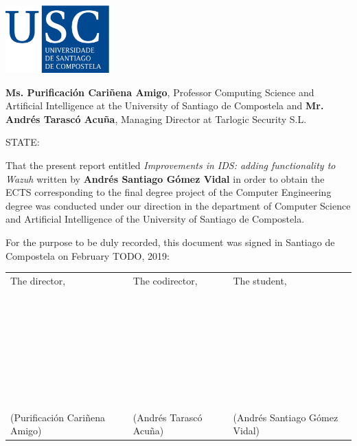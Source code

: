 \pagestyle{plain}
\includegraphics[width=4cm]{figuras/logo_usc.eps}

\vspace{1cm}
{\bf Ms. Purificación Cariñena Amigo}, Professor Computing Science and Artificial Intelligence at the University of Santiago de Compostela and {\bf Mr. Andrés Tarascó Acuña}, Managing Director at Tarlogic Security S.L.

\vspace{1cm}
STATE:

\vspace{1cm}
That the present report entitled \textit{Improvements in IDS: adding functionality to Wazuh} written by \textbf{Andrés Santiago Gómez Vidal} in order to obtain the ECTS corresponding to the final degree project of the Computer Engineering degree was conducted under our direction in the department of Computer Science and Artificial Intelligence of the University of Santiago de Compostela.

\vspace{1cm}
For the purpose to be duly recorded, this document was signed in Santiago de Compostela on February TODO, 2019:

\vspace{2cm}
\footnotesize
\begin{tabular}{lll}
The director, & The codirector, & The student, \\
~ \\
~ \\
~ \\
~ \\
~ \\
~ \\
~ \\
(Purificación Cariñena Amigo) & (Andrés Tarascó Acuña) & (Andrés Santiago Gómez Vidal)
\end{tabular}
\normalsize
